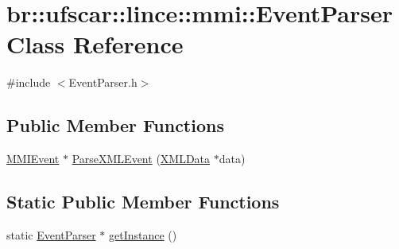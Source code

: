 \hypertarget{classbr_1_1ufscar_1_1lince_1_1mmi_1_1EventParser}{
\section{br::ufscar::lince::mmi::EventParser Class Reference}
\label{classbr_1_1ufscar_1_1lince_1_1mmi_1_1EventParser}
}


{\ttfamily \#include $<$EventParser.h$>$}

\subsection*{Public Member Functions}
\begin{DoxyCompactItemize}
\item 
\hyperlink{classbr_1_1ufscar_1_1lince_1_1mmi_1_1MMIEvent}{MMIEvent} $\ast$ \hyperlink{classbr_1_1ufscar_1_1lince_1_1mmi_1_1EventParser_a1af73dd394ee69726f59893cf44fd6cb}{ParseXMLEvent} (\hyperlink{structbr_1_1ufscar_1_1lince_1_1mmi_1_1XMLData}{XMLData} $\ast$data)
\end{DoxyCompactItemize}
\subsection*{Static Public Member Functions}
\begin{DoxyCompactItemize}
\item 
static \hyperlink{classbr_1_1ufscar_1_1lince_1_1mmi_1_1EventParser}{EventParser} $\ast$ \hyperlink{classbr_1_1ufscar_1_1lince_1_1mmi_1_1EventParser_a83a5e79fec5383e011c86a04cc1be477}{getInstance} ()
\end{DoxyCompactItemize}


